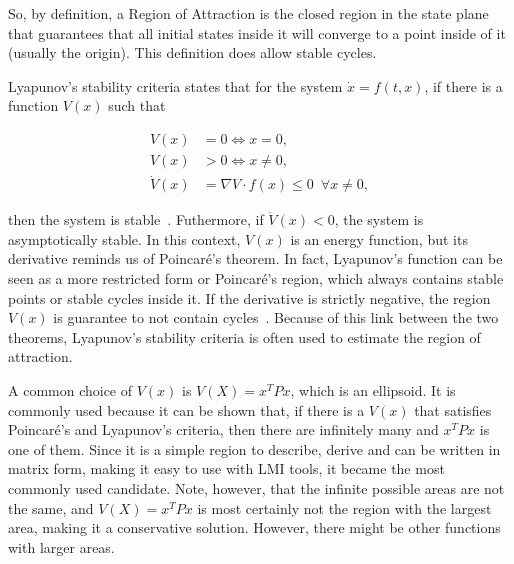 So, by definition, a Region of Attraction is the closed region in the state
plane that guarantees that all initial states inside it will converge to a point
inside of it (usually the origin). This definition does allow stable cycles.

Lyapunov's stability criteria states that for the system \(\dot{x} = f(t, x)\),
if there is a function \(V(x)\) such that

\begin{align}
	V(x)       & = 0 \iff x = 0,                                           \\
	V(x)       & > 0 \iff x \ne 0,                                         \\
	\dot{V}(x) & = \nabla{}V\cdot{}f(x) \le 0 \phantom{0} \forall x \ne 0,
\end{align}

then the system is stable~\parencite{chen:linear,hespanha:linear}. Futhermore,
if \(\dot{V}(x)<0\), the system is asymptotically stable. In this context,
\(V(x)\) is an energy function, but its derivative reminds us of Poincaré's
theorem. In fact, Lyapunov's function can be seen as a more restricted form or
Poincaré's region, which always contains stable points or stable cycles inside
it. If the derivative is strictly negative, the region \(V(x)\) is guarantee to
not contain cycles~\parencite{chen:linear}. Because of this link between the two
theorems, Lyapunov's stability criteria is often used to estimate the region of
attraction.

A common choice of \(V(x)\) is \(V(X)=x^{T}Px\), which is an ellipsoid. It is
commonly used because it can be shown that, if there is a \(V(x)\) that
satisfies Poincaré's and Lyapunov's criteria, then there are infinitely many and
\(x^{T}Px\) is one of them. Since it is a simple region to describe, derive and
can be written in matrix form, making it easy to use with LMI tools, it became
the most commonly used candidate. Note, however, that the infinite possible
areas are not the same, and \(V(X)=x^{T}Px\) is most certainly not the region
with the largest area, making it a conservative solution. However, there might
be other functions with larger areas.
